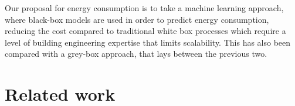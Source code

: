 \documentclass[10pt, conference, compsocconf]{IEEEtran}
\begin{document}
Our proposal for energy consumption is to take a machine learning approach, where black-box models are used in order to predict energy consumption, reducing the cost compared to traditional white box processes which require a level of building engineering expertise that limits scalability. This has also been compared with a grey-box approach, that lays between the previous two.













\section{Related work}
\end{document}
